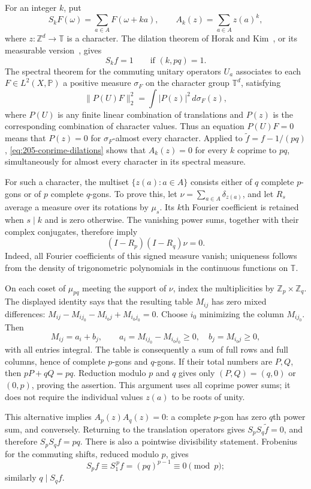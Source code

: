 \documentclass[11pt,reqno]{amsart}
\newcommand{\Z}{\mathbb Z}
\newcommand{\T}{\mathbb T}
\theoremstyle{definition}
\theoremstyle{remark}
\numberwithin{equation}{section}
\begin{document}
For an integer $k$, put
\[
 S_kF(\omega)=\sum_{a\in A}F(\omega+ka),\qquad
 A_k(z)=\sum_{a\in A}z(a)^k,
\]
where $z:\Z^d\to\T$ is a character.
The dilation theorem of Horak and Kim~\cite[Theorem~8]{HK}, or its
measurable version~\cite[Theorem~1.2(i)]{GGRT}, gives
\begin{equation}\label{eq:205-coprime-dilations}
 S_kf=1\qquad\text{if }(k,pq)=1.
\end{equation}
The spectral theorem for the commuting unitary operators $U_a$
associates to each $F\in L^2(X,\mathbb P)$ a positive measure
$\sigma_F$ on the character group $\T^d$, satisfying
\[
 \|P(U)F\|_2^2=\int |P(z)|^2\,d\sigma_F(z),
\]
where $P(U)$ is any finite linear combination of translations and
$P(z)$ is the corresponding combination of character values. Thus an
equation $P(U)F=0$ means that $P(z)=0$ for $\sigma_F$-almost every
character. Applied to $\widetilde f=f-1/(pq)$,
\eqref{eq:205-coprime-dilations} shows that
$A_k(z)=0$ for every $k$ coprime to $pq$, simultaneously for almost
every character in its spectral measure.

For such a character, the multiset $\{z(a):a\in A\}$ consists either
of $q$ complete $p$-gons or of $p$ complete $q$-gons.
To prove this, let
$\nu=\sum_{a\in A}\delta_{z(a)}$, and let $R_s$ average a measure over
its rotations by $\mu_s$. Its $k$th Fourier coefficient is retained
when $s\mid k$ and is zero otherwise. The vanishing power sums,
together with their complex conjugates, therefore imply
\[
 (I-R_p)(I-R_q)\nu=0.
\]
Indeed, all Fourier coefficients of this signed measure vanish;
uniqueness follows from the density of trigonometric polynomials in
the continuous functions on $\T$.

On each coset of $\mu_{pq}$ meeting the support of $\nu$, index the
multiplicities by $\Z_p\times\Z_q$. The displayed identity says that
the resulting table $M_{ij}$ has zero mixed differences:
$M_{ij}-M_{ij_0}-M_{i_0j}+M_{i_0j_0}=0$.
Choose $i_0$ minimizing the column $M_{ij_0}$. Then
\[
 M_{ij}=a_i+b_j,\qquad
 a_i=M_{ij_0}-M_{i_0j_0}\ge0,\quad b_j=M_{i_0j}\ge0,
\]
with all entries integral. The table is consequently a sum of full
rows and full columns, hence of complete $p$-gons and $q$-gons.
If their total numbers are $P,Q$, then $pP+qQ=pq$.
Reduction modulo $p$ and $q$ gives only
$(P,Q)=(q,0)$ or $(0,p)$, proving the assertion. This argument uses
all coprime power sums; it does not require the individual values
$z(a)$ to be roots of unity.

This alternative implies $A_p(z)A_q(z)=0$: a complete $p$-gon has
zero $q$th power sum, and conversely. Returning to the translation
operators gives $S_pS_q\widetilde f=0$, and therefore
$S_pS_qf=pq$. There is also a pointwise divisibility statement.
Frobenius for the commuting shifts, reduced modulo $p$, gives
\[
 S_pf\equiv S_1^{\,p}f=(pq)^{p-1}\equiv0\pmod p;
\]
similarly $q\mid S_qf$.
\end{document}
